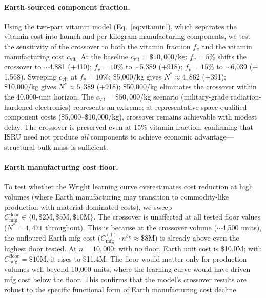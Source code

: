 \documentclass[preprint,12pt]{elsarticle}
\begin{document}
\paragraph{Earth-sourced component fraction.} Using the two-part vitamin model (Eq.~\ref{eq:vitamin}), which separates the vitamin cost into launch and per-kilogram manufacturing components, we test the sensitivity of the crossover to both the vitamin fraction $f_v$ and the vitamin manufacturing cost $c_{\mathrm{vit}}$. At the baseline $c_{\mathrm{vit}} = \$10{,}000$/kg: $f_v = 5\%$ shifts the crossover to $\sim$4{,}881 ($+$410); $f_v = 10\%$ to $\sim$5{,}389 ($+$918); $f_v = 15\%$ to $\sim$6{,}039 ($+$1{,}568). Sweeping $c_{\mathrm{vit}}$ at $f_v = 10\%$: \$5{,}000/kg gives $N^* \approx 4{,}862$ ($+$391); \$10{,}000/kg gives $N^* \approx 5{,}389$ ($+$918); \$50{,}000/kg eliminates the crossover within the 40{,}000-unit horizon. The $c_{\mathrm{vit}} = \$50{,}000$/kg scenario (military-grade radiation-hardened electronics) represents an extreme; at representative space-qualified component costs (\$5{,}000--\$10{,}000/kg), crossover remains achievable with modest delay. The crossover is preserved even at 15\% vitamin fraction, confirming that ISRU need not produce \emph{all} components to achieve economic advantage---structural bulk mass is sufficient.

\paragraph{Earth manufacturing cost floor.} To test whether the Wright learning curve overestimates cost reduction at high volumes (where Earth manufacturing may transition to commodity-like production with material-dominated costs), we sweep $C_{\mathrm{mfg}}^{\mathrm{floor}} \in \{0, \$2\text{M}, \$5\text{M}, \$10\text{M}\}$. The crossover is unaffected at all tested floor values ($N^* = 4{,}471$ throughout). This is because at the crossover volume ($\sim$4{,}500 units), the unfloured Earth mfg cost ($C_{\mathrm{mfg}}^{(1)} \cdot n^{b_E} \approx \$8$M) is already above even the highest floor tested. At $n = 10{,}000$: with no floor, Earth unit cost is \$10.0M; with $C_{\mathrm{mfg}}^{\mathrm{floor}} = \$10$M, it rises to \$11.4M. The floor would matter only for production volumes well beyond 10{,}000 units, where the learning curve would have driven mfg cost below the floor. This confirms that the model's crossover results are robust to the specific functional form of Earth manufacturing cost decline.
\end{document}
